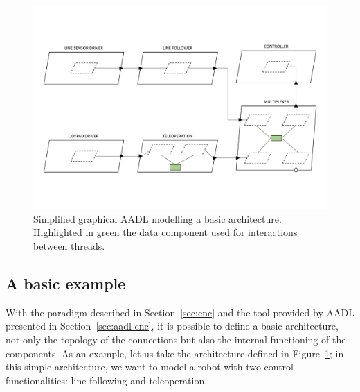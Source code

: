 \begin{landscape}
	\begin{figure}[t]
	\centering
	\includegraphics[height=0.88\textwidth]{gfx/arch_figures-25}
	\caption[Simplified graphical AADL modelling a basic architecture.]{Simplified graphical AADL modelling a basic architecture. Highlighted in green the data component used for interactions between threads.}
	\label{fig:cnc-arch}
	\end{figure}
\end{landscape}

\subsection{A basic example}
\label{sec:cnc-basic}
With the paradigm described in Section~\ref{sec:cnc} and the tool provided by AADL presented in Section~\ref{sec:aadl-cnc}, it is possible to define a basic architecture, not only the topology of the connections but also the internal functioning of the components. As an example, let us take the architecture defined in Figure~\ref{fig:cnc-arch}; in this simple architecture, we want to model a robot with two control functionalities: line following and teleoperation.

